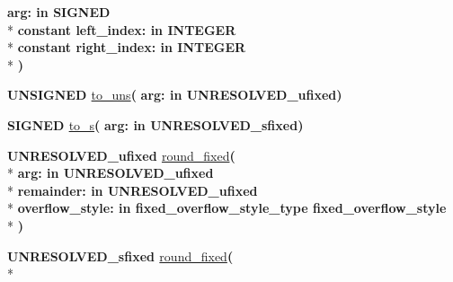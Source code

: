\begin{DoxyCompactItemize}
{\bfseries \textcolor{vhdlchar}{arg\+: }\textcolor{stringliteral}{in }{\bfseries \textcolor{comment}{S\+I\+G\+N\+E\+D}\textcolor{vhdlchar}{ }}}\\*
{\bfseries {\bfseries \textcolor{keywordflow}{constant}\textcolor{vhdlchar}{ }}\textcolor{vhdlchar}{left\+\_\+index\+: }\textcolor{stringliteral}{in }{\bfseries \textcolor{comment}{I\+N\+T\+E\+G\+E\+R}\textcolor{vhdlchar}{ }}}\\*
{\bfseries {\bfseries \textcolor{keywordflow}{constant}\textcolor{vhdlchar}{ }}\textcolor{vhdlchar}{right\+\_\+index\+: }\textcolor{stringliteral}{in }{\bfseries \textcolor{comment}{I\+N\+T\+E\+G\+E\+R}\textcolor{vhdlchar}{ }}}\\*
{\bfseries  )} 
\item 
{\bfseries {\bfseries \textcolor{comment}{U\+N\+S\+I\+G\+N\+E\+D}\textcolor{vhdlchar}{ }}} \hyperlink{class__fixed__pkg_a970b6533467c860b47209bc0d924721c}{to\+\_\+uns}{\bfseries  ( }{\bfseries \textcolor{vhdlchar}{arg\+: }\textcolor{stringliteral}{in }\textcolor{vhdlchar}{U\+N\+R\+E\+S\+O\+L\+V\+E\+D\+\_\+ufixed}}{\bfseries  )} 
\item 
{\bfseries {\bfseries \textcolor{comment}{S\+I\+G\+N\+E\+D}\textcolor{vhdlchar}{ }}} \hyperlink{class__fixed__pkg_aff9c3e3783ab1bbb1cbba560b051e19b}{to\+\_\+s}{\bfseries  ( }{\bfseries \textcolor{vhdlchar}{arg\+: }\textcolor{stringliteral}{in }\textcolor{vhdlchar}{U\+N\+R\+E\+S\+O\+L\+V\+E\+D\+\_\+sfixed}}{\bfseries  )} 
\item 
{\bfseries {\bfseries \textcolor{vhdlchar}{U\+N\+R\+E\+S\+O\+L\+V\+E\+D\+\_\+ufixed}\textcolor{vhdlchar}{ }}} \hyperlink{class__fixed__pkg_af8029dfc107a75816e7fd14e74588de1}{round\+\_\+fixed}{\bfseries  ( }\\*
{\bfseries \textcolor{vhdlchar}{arg\+: }\textcolor{stringliteral}{in }\textcolor{vhdlchar}{U\+N\+R\+E\+S\+O\+L\+V\+E\+D\+\_\+ufixed}}\\*
{\bfseries \textcolor{vhdlchar}{remainder\+: }\textcolor{stringliteral}{in }\textcolor{vhdlchar}{U\+N\+R\+E\+S\+O\+L\+V\+E\+D\+\_\+ufixed}}\\*
{\bfseries \textcolor{vhdlchar}{overflow\+\_\+style\+: }\textcolor{stringliteral}{in }\textcolor{vhdlchar}{fixed\+\_\+overflow\+\_\+style\+\_\+type     fixed\+\_\+overflow\+\_\+style}}\\*
{\bfseries  )} 
\item 
{\bfseries {\bfseries \textcolor{vhdlchar}{U\+N\+R\+E\+S\+O\+L\+V\+E\+D\+\_\+sfixed}\textcolor{vhdlchar}{ }}} \hyperlink{class__fixed__pkg_ae3c2cc2a68146003c9aa5dfaefde0234}{round\+\_\+fixed}{\bfseries  ( }\\*

\end{DoxyCompactItemize}
